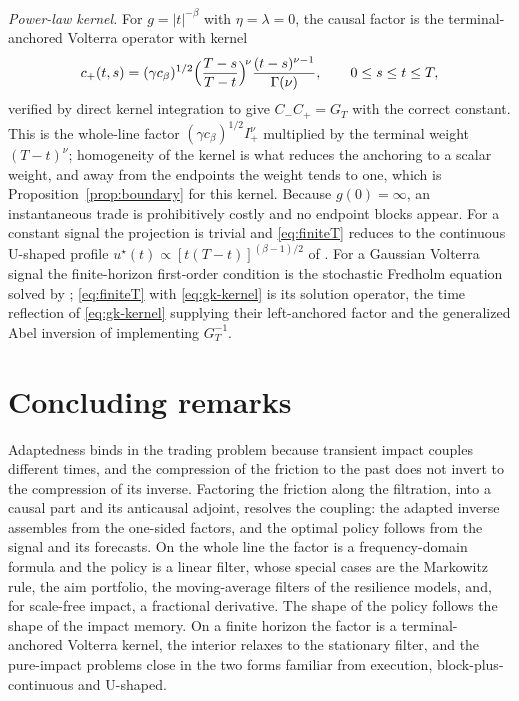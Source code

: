 \documentclass[11pt]{article}
\theoremstyle{plain}
\theoremstyle{definition}
\theoremstyle{remark}
\begin{document}
\emph{Power-law kernel.} For $g=|t|^{-\beta}$ with $\eta=\lambda=0$, the causal factor is the terminal-anchored Volterra operator with kernel
\begin{equation}\label{eq:gk-kernel}
c_+(t,s)=(\gamma c_\beta)^{1/2}\Bigl(\frac{T-s}{T-t}\Bigr)^{\!\nu}\frac{(t-s)^{\nu-1}}{\Gamma(\nu)},
\qquad 0\le s\le t\le T,
\end{equation}
verified by direct kernel integration to give $C_-C_+=G_T$ with the correct constant. This is the whole-line factor $(\gamma c_\beta)^{1/2}I^\nu_+$ multiplied by the terminal weight $(T-t)^\nu$; homogeneity of the kernel is what reduces the anchoring to a scalar weight, and away from the endpoints the weight tends to one, which is Proposition~\ref{prop:boundary} for this kernel. Because $g(0)=\infty$, an instantaneous trade is prohibitively costly and no endpoint blocks appear. For a constant signal the projection is trivial and \eqref{eq:finiteT} reduces to the continuous U-shaped profile $u^\star(t)\propto[t(T-t)]^{(\beta-1)/2}$ of \citet[Ex.~2.30]{GatheralSchiedSlynko2012}. For a Gaussian Volterra signal the finite-horizon first-order condition is the stochastic Fredholm equation solved by \citet{FordeSanchezSmith2022}; \eqref{eq:finiteT} with \eqref{eq:gk-kernel} is its solution operator, the time reflection of \eqref{eq:gk-kernel} supplying their left-anchored factor and the generalized Abel inversion of \citet{ChakrabartiGeorge1994} implementing $G_T^{-1}$.

\section{Concluding remarks}\label{sec:conclusion}

Adaptedness binds in the trading problem because transient impact couples different times, and the compression of the friction to the past does not invert to the compression of its inverse. Factoring the friction along the filtration, into a causal part and its anticausal adjoint, resolves the coupling: the adapted inverse assembles from the one-sided factors, and the optimal policy follows from the signal and its forecasts. On the whole line the factor is a frequency-domain formula and the policy is a linear filter, whose special cases are the Markowitz rule, the aim portfolio, the moving-average filters of the resilience models, and, for scale-free impact, a fractional derivative. The shape of the policy follows the shape of the impact memory. On a finite horizon the factor is a terminal-anchored Volterra kernel, the interior relaxes to the stationary filter, and the pure-impact problems close in the two forms familiar from execution, block-plus-continuous and U-shaped.
\end{document}
